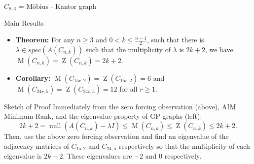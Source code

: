 \documentclass[final]{beamer}
\newcommand{\mr}{\operatorname{mr}}
\newcommand{\M}{\operatorname{M}}
\newcommand{\Z}{\operatorname{Z}}
\newcommand{\nul}{\operatorname{null}}
\newcommand{\bit}{\begin{itemize}}
\newcommand{\eit}{\end{itemize}}
\begin{document}
\begin{frame}{}
\begin{columns}[t]
\begin{column}{0.38 \linewidth}
\begin{block}{$C_{8,3}$ = M\"{o}bius - Kantor graph}
\end{block}
        
\begin{block}{Main Results}
\bit
\item[]{\bf Theorem:} For any $n \geq 3$ and $0 <  k  \leq \frac{n-1}{2} $, such that there is $\lambda \in spec(A(C_{n,k}))$ such that the multiplicity of $\lambda$ is  $2k+2$, we have $\M(C_{n,k}) = \Z(C_{n,k}) = 2k+2$.

\item[]{\bf Corollary:} $\M(C_{15r,2}) = \Z(C_{15r,2}) = 6$ and 
$\M(C_{24r,5}) = \Z(C_{24r,5}) = 12$ for all $r \geq 1$.
\eit
\end{block}

\begin{block}{Sketch of Proof}
Immediately from the zero forcing observation (above), AIM Minimum Rank, and the eigenvalue property of GP graphs (left):
\[
2k+2 = \nul(A(C_{n,k}) - \lambda I) \leq \M(C_{n,k}) \leq \Z(C_{n,k}) \leq 2k+2.
\]
Then, use the above zero forcing observation and find an eigenvalue of the adjacency matrices of $C_{15,2}$ and $C_{24,5}$ respectively so that the multiplicity of  each eigenvalue is $2k+2$. These eigenvalues are $-2$ and $0$ respectively.
\end{block}



\end{column}
\end{columns}
\end{frame}
\end{document}
